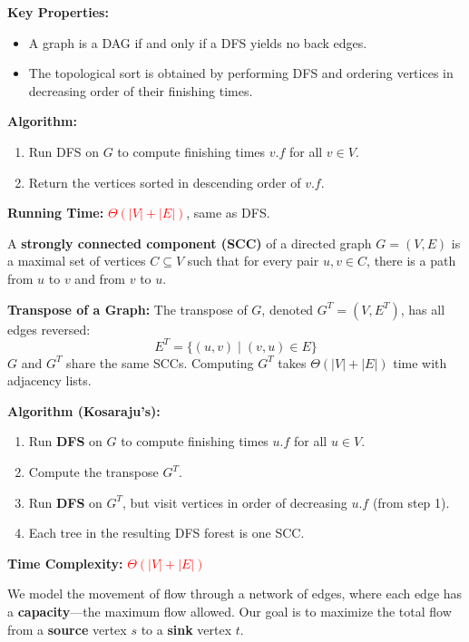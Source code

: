 \documentclass[a4paper,landscape]{article}
\newcommand{\timecomplexity}[1]{\textcolor{red}{#1}}
\begin{document}
\begin{multicols}{7}
\textbf{Key Properties:}
\begin{itemize}[noitemsep, topsep=0pt]
    \item A graph is a DAG if and only if a DFS yields no back edges.
    \item The topological sort is obtained by performing DFS and ordering vertices in decreasing order of their finishing times.
\end{itemize}

\textbf{Algorithm:}
\begin{enumerate}[noitemsep, topsep=0pt]
    \item Run DFS on $G$ to compute finishing times $v.f$ for all $v \in V$.
    \item Return the vertices sorted in descending order of $v.f$.
\end{enumerate}

\textbf{Running Time:} \timecomplexity{$\Theta(|V| + |E|)$}, same as DFS.
\endtcolorbox

\tcolorbox[mybox={Strongly Connected Components}]
A \textbf{strongly connected component (SCC)} of a directed graph $G = (V, E)$ is a maximal set of vertices $C \subseteq V$ such that for every pair $u, v \in C$, there is a path from $u$ to $v$ and from $v$ to $u$.

\textbf{Transpose of a Graph:} The transpose of $G$, denoted $G^T = (V, E^T)$, has all edges reversed:
\[
E^T = \{(u, v) \mid (v, u) \in E\}
\]
$G$ and $G^T$ share the same SCCs. Computing $G^T$ takes $\Theta(|V| + |E|)$ time with adjacency lists.

\textbf{Algorithm (Kosaraju's):}
\begin{enumerate}[noitemsep, topsep=0pt]
    \item Run \textbf{DFS} on $G$ to compute finishing times $u.f$ for all $u \in V$.
    \item Compute the transpose $G^T$.
    \item Run \textbf{DFS} on $G^T$, but visit vertices in order of decreasing $u.f$ (from step 1).
    \item Each tree in the resulting DFS forest is one SCC.
\end{enumerate}

\textbf{Time Complexity:} \timecomplexity{\(\Theta(|V| + |E|)\)}
\endtcolorbox

\tcolorbox[mybox={Flow Network}]
We model the movement of flow through a network of edges, where each edge has a \textbf{capacity}—the maximum flow allowed. Our goal is to maximize the total flow from a \textbf{source} vertex $s$ to a \textbf{sink} vertex $t$.


\end{multicols}
\end{document}
